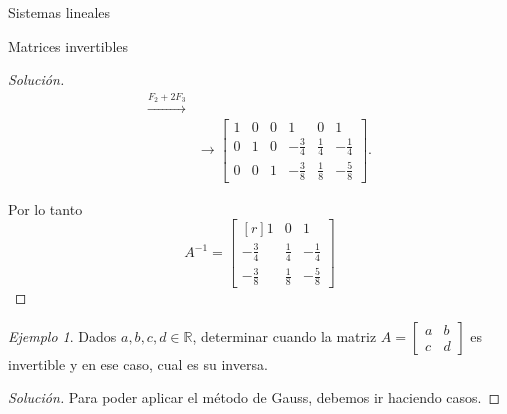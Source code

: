\documentclass[a4paper,12pt,twoside,spanish,reqno]{amsbook}
\numberwithin{equation}{section}
\theoremstyle{definition}
\theoremstyle{remark}
\newtheorem*{ejemplo*}{Ejemplo}
\begin{document}
\begin{chapter}{Sistemas lineales}
\begin{section}{Matrices invertibles}
\begin{proof}[Solución]
\begin{align*}
                \stackrel{F_2+2F_3}{\longrightarrow} \\
                &\longrightarrow
                \left[\begin{array}{rrr|rrr}	1&0&0&1&0&1\\ 0&1&0&-\frac34&\frac14&-\frac14 \\ 0&0&1&-\frac38&\frac18&-\frac58 \end{array}\right].
                \end{align*}
                
                Por lo tanto 
                \begin{equation*}
                A^{-1} = 	\begin{bmatrix*}[r]	1&0&1\\ -\frac34&\frac14&-\frac14 \\ -\frac38&\frac18&-\frac58 \end{bmatrix*}
                \end{equation*}
            \end{proof}
            
            \begin{ejemplo*}\label{inv-2x2-0}
                Dados $a,b,c,d \in \mathbb R$, determinar cuando la matriz $A = \begin{bmatrix*} a&b\\c&d\end{bmatrix*}$  es invertible y en ese caso,  cual es su inversa. 
            \end{ejemplo*}
            \begin{proof}[Solución] Para poder aplicar el método de Gauss, debemos ir haciendo casos. 
                

\end{proof}
\end{section}
\end{chapter}
\end{document}
